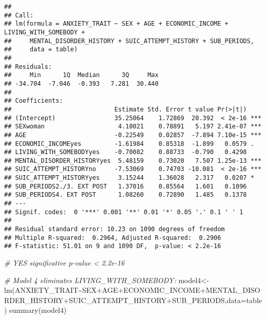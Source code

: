 \documentclass[
]{book}
\newenvironment{Shaded}{\begin{snugshade}}{\end{snugshade}}
\newcommand{\AttributeTok}[1]{\textcolor[rgb]{0.77,0.63,0.00}{#1}}
\newcommand{\CommentTok}[1]{\textcolor[rgb]{0.56,0.35,0.01}{\textit{#1}}}
\newcommand{\FunctionTok}[1]{\textcolor[rgb]{0.00,0.00,0.00}{#1}}
\newcommand{\NormalTok}[1]{#1}
\newcommand{\OtherTok}[1]{\textcolor[rgb]{0.56,0.35,0.01}{#1}}
\newcommand{\SpecialCharTok}[1]{\textcolor[rgb]{0.00,0.00,0.00}{#1}}
\begin{document}
\begin{verbatim}
## 
## Call:
## lm(formula = ANXIETY_TRAIT ~ SEX + AGE + ECONOMIC_INCOME + LIVING_WITH_SOMEBODY + 
##     MENTAL_DISORDER_HISTORY + SUIC_ATTEMPT_HISTORY + SUB_PERIODS, 
##     data = table)
## 
## Residuals:
##     Min      1Q  Median      3Q     Max 
## -34.704  -7.046  -0.393   7.281  30.440 
## 
## Coefficients:
##                            Estimate Std. Error t value Pr(>|t|)    
## (Intercept)                35.25064    1.72869  20.392  < 2e-16 ***
## SEXwoman                    4.10021    0.78891   5.197 2.41e-07 ***
## AGE                        -0.22549    0.02857  -7.894 7.10e-15 ***
## ECONOMIC_INCOMEyes         -1.61984    0.85318  -1.899   0.0579 .  
## LIVING_WITH_SOMEBODYyes    -0.70082    0.88733  -0.790   0.4298    
## MENTAL_DISORDER_HISTORYyes  5.48159    0.73020   7.507 1.25e-13 ***
## SUIC_ATTEMPT_HISTORYno     -7.53069    0.74703 -10.081  < 2e-16 ***
## SUIC_ATTEMPT_HISTORYyes     3.15244    1.36028   2.317   0.0207 *  
## SUB_PERIODS2./3. EXT POST   1.37016    0.85564   1.601   0.1096    
## SUB_PERIODS4. EXT POST      1.08260    0.72890   1.485   0.1378    
## ---
## Signif. codes:  0 '***' 0.001 '**' 0.01 '*' 0.05 '.' 0.1 ' ' 1
## 
## Residual standard error: 10.23 on 1090 degrees of freedom
## Multiple R-squared:  0.2964, Adjusted R-squared:  0.2906 
## F-statistic: 51.01 on 9 and 1090 DF,  p-value: < 2.2e-16
\end{verbatim}

\begin{Shaded}
\begin{Highlighting}[]
\CommentTok{\# YES significative p{-}value \textless{} 2.2e{-}16}

\CommentTok{\# Model 4 eliminates LIVING\_WITH\_SOMEBODY:}
\NormalTok{model4}\OtherTok{\textless{}{-}}\FunctionTok{lm}\NormalTok{(ANXIETY\_TRAIT}\SpecialCharTok{\textasciitilde{}}\NormalTok{SEX}\SpecialCharTok{+}\NormalTok{AGE}\SpecialCharTok{+}\NormalTok{ECONOMIC\_INCOME}\SpecialCharTok{+}\NormalTok{MENTAL\_DISORDER\_HISTORY}\SpecialCharTok{+}\NormalTok{SUIC\_ATTEMPT\_HISTORY}\SpecialCharTok{+}\NormalTok{SUB\_PERIODS,}\AttributeTok{data=}\NormalTok{table)}
\FunctionTok{summary}\NormalTok{(model4)}
\end{Highlighting}
\end{Shaded}
\end{document}
